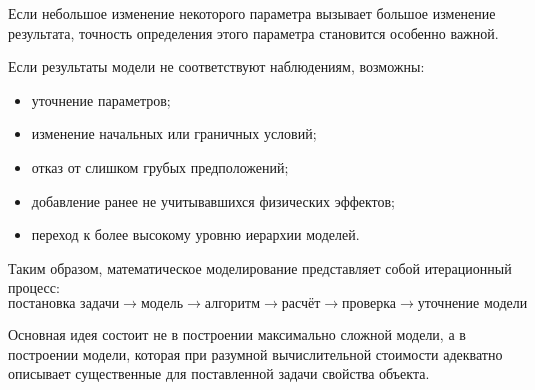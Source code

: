 Если небольшое изменение некоторого параметра вызывает большое изменение
результата, точность определения этого параметра становится особенно важной.

Если результаты модели не соответствуют наблюдениям, возможны:
\begin{itemize}
	\item уточнение параметров;
	\item изменение начальных или граничных условий;
	\item отказ от слишком грубых предположений;
	\item добавление ранее не учитывавшихся физических эффектов;
	\item переход к более высокому уровню иерархии моделей.
\end{itemize}

Таким образом, математическое моделирование представляет собой
итерационный процесс:
\[
\boxed{
	\text{постановка задачи}
	\rightarrow
	\text{модель}
	\rightarrow
	\text{алгоритм}
	\rightarrow
	\text{расчёт}
	\rightarrow
	\text{проверка}
	\rightarrow
	\text{уточнение модели}
}.
\]

Основная идея состоит не в построении максимально сложной модели,
а в построении модели, которая при разумной вычислительной стоимости
адекватно описывает существенные для поставленной задачи свойства объекта.

\newpage